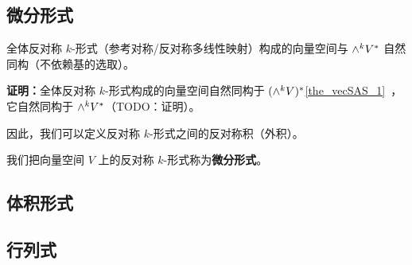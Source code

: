 
\begin{issues}
\issueDraft
\end{issues}


\subsection{微分形式}

\begin{theorem}{}
全体反对称 $k$-形式（参考对称/反对称多线性映射）构成的向量空间与 ${\large \wedge}^k V^*$ 自然同构（不依赖基的选取）。
\end{theorem}

\textbf{证明：}全体反对称 $k$-形式构成的向量空间自然同构于 $({\large \wedge}^k V)^*$\autoref{the_vecSAS_1}~，它自然同构于 ${\large \wedge}^k V^*$（TODO：证明）。

因此，我们可以定义反对称 $k$-形式之间的反对称积（外积）。

我们把向量空间 $V$ 上的反对称 $k$-形式称为\textbf{微分形式}。

\subsection{体积形式}


\subsection{行列式}

